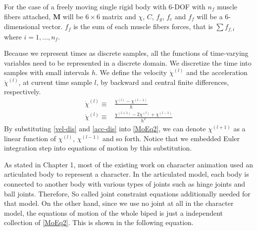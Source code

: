 \documentclass[master,english,final]{kaist-ucs}
\begin{document}
For the case of a freely moving single
rigid body with 6-DOF with $n_f$ muscle fibers attached,
$\mathbf{M}$ will be $6\times 6$ matrix and $\chi$,
$C$, $f_g$, $f_c$ and $f_f$ will be a 6-dimensional vector. $f_f$ is the sum of
each muscle fibers forces, that is $\sum f_{f,i}$ where $i=1,\dots,n_f$.

Because we represent times as discrete samples, all the functions of
time-varying variables need to be represented in a discrete domain.
We discretize the time into samples with small intervals $h$. We define
the velocity $\dot\chi^{(l)}$ and the acceleration $\ddot\chi^{(l)}$, at current
time sample $l$, by backward and central finite differences, respectively.
\begin{align}
\dot\chi^{(l)}  \equiv {} & \frac{\chi^{(l)}-\chi^{(l-1)}}{h}\label{vel-dis}\\
\ddot\chi^{(l)} \equiv {} & \frac{\chi^{(l+1)}-2\chi^{(l)}+\chi^{(l-1)}}{h^2}\label{acc-dis}
\end{align}
By substituting \eqref{vel-dis} and \eqref{acc-dis} into \eqref{MoEq2},
we can denote $\chi^{(l+1)}$ as a linear function of $\chi^{(l)}$, $\chi^{(l-1)}$ and so forth.
Notice that we embedded Euler integration step into equations of motion by this substitution.

As stated in Chapter 1, most of the existing work on
character animation used an articulated body to represent a character.
In the articulated model, each body is connected to another body with
various types of joints such as hinge joints and ball joints.
Therefore, So called joint constraint equations additionally
needed for that model.
On the other hand, since we use no joint at all in the character
model, the equations of motion of the whole biped is just a independent collection of
\eqref{MoEq2}. This is shown in the following equation.
\end{document}
